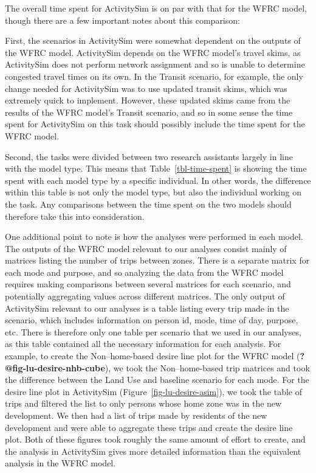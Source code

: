\documentclass[fancy, twoside, mastersfancy, ms]{byuthesis}
\begin{document}
The overall time spent for ActivitySim is on par with that for the WFRC
model, though there are a few important notes about this comparison:

First, the scenarios in ActivitySim were somewhat dependent on the
outputs of the WFRC model. ActivitySim depends on the WFRC model's
travel skims, as ActivitySim does not perform network assignment and so
is unable to determine congested travel times on its own. In the Transit
scenario, for example, the only change needed for ActivitySim was to use
updated transit skims, which was extremely quick to implement. However,
these updated skims came from the results of the WFRC model's Transit
scenario, and so in some sense the time spent for ActivitySim on this
task should possibly include the time spent for the WFRC model.

Second, the tasks were divided between two research assistants largely
in line with the model type. This means that Table~\ref{tbl-time-spent}
is showing the time spent with each model type by a specific individual.
In other words, the difference within this table is not only the model
type, but also the individual working on the task. Any comparisons
between the time spent on the two models should therefore take this into
consideration.

One additional point to note is how the analyses were performed in each
model. The outputs of the WFRC model relevant to our analyses consist
mainly of matrices listing the number of trips between zones. There is a
separate matrix for each mode and purpose, and so analyzing the data
from the WFRC model requires making comparisons between several matrices
for each scenario, and potentially aggregating values across different
matrices. The only output of ActivitySim relevant to our analyses is a
table listing every trip made in the scenario, which includes
information on person id, mode, time of day, purpose, etc. There is
therefore only one table per scenario that we used in our analyses, as
this table contained all the necessary information for each analysis.
For example, to create the Non--home-based desire line plot for the WFRC
model (\textbf{?@fig-lu-desire-nhb-cube}), we took the Non--home-based
trip matrices and took the difference between the Land Use and baseline
scenario for each mode. For the desire line plot in ActivitySim
(Figure~\ref{fig-lu-desire-asim}), we took the table of trips and
filtered the list to only persons whose home zone was in the new
development. We then had a list of trips made by residents of the new
development and were able to aggregate these trips and create the desire
line plot. Both of these figures took roughly the same amount of effort
to create, and the analysis in ActivitySim gives more detailed
information than the equivalent analysis in the WFRC model.
\end{document}

